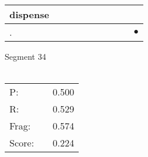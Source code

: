 \documentclass[landscape]{article}
\newcommand{\ssp}{\hspace{2pt}}
\newcommand{\mex}{\cellcolor{g}$\bullet$}
\begin{document}
\begin{tabular}{|l|p{10pt}|p{10pt}|p{10pt}|p{10pt}|p{10pt}|p{10pt}|p{10pt}|p{10pt}|p{10pt}|}
\hline
\ssp dispense \ssp&\hspace{2pt}&\hspace{2pt}&\hspace{2pt}&\hspace{2pt}&\hspace{2pt}&\hspace{2pt}&\hspace{2pt}&\hspace{2pt}&\hspace{2pt}\\
\hline
\ssp \cellcolor{ref8}. \ssp&\hspace{2pt}&\hspace{2pt}&\hspace{2pt}&\hspace{2pt}&\hspace{2pt}&\hspace{2pt}&\hspace{2pt}&\hspace{2pt}&\hspace{2pt}\mex\\
\hline
\end{tabular}

\vspace{6pt}
\noindent Segment 34\\\\
\noindent\begin{tabular}{lm{12pt}r}
\hline
P:&&0.500\\
R:&&0.529\\
Frag:&&0.574\\
Score:&&0.224\\
\end{tabular}

\newpage
\end{document}
